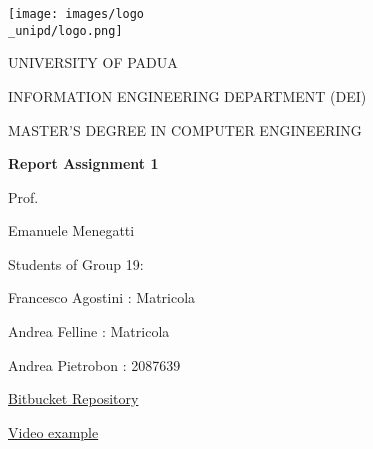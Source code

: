\begin{titlepage}
    \begin{center}
        \texttt{[image: images/logo\\\_unipd/logo.png]}
        
        \vspace*{1cm}
        \Large
        \textmd{UNIVERSITY OF PADUA}
        
        \vspace*{1cm}
        \large
        \textmd{INFORMATION ENGINEERING DEPARTMENT (DEI)}
                
        \vspace*{0.5cm}
        \large
        \textmd{MASTER'S DEGREE IN COMPUTER ENGINEERING} 
                
        \vspace*{1cm}
        \Huge
        \textbf{Report Assignment 1}
        
        
        \raggedright
        \vspace*{1cm}
        \large
        \textmd{Prof.}
        
        \textmd{Emanuele Menegatti}
        
        \raggedleft
        \vspace*{0.5cm}
        \large
        \textmd{Students of Group 19:}
                
        \textmd{Francesco Agostini : Matricola}       
        
        \textmd{Andrea Felline : Matricola}        
        
        \textmd{Andrea Pietrobon : 2087639}
        
        \raggedright
        \vspace*{2cm}
        \large
        \textmd{\href{https://bitbucket.org/unipd-projects/ir2324_group_19/}{Bitbucket Repository}}
        
        \textmd{\href{https://drive.google.com/file/d/1OVGCOG_-ivf0-LZL4KkG6C-o00eFIXfU/view?usp=sharing}{Video example}}


        
    \end{center}
\end{titlepage}
